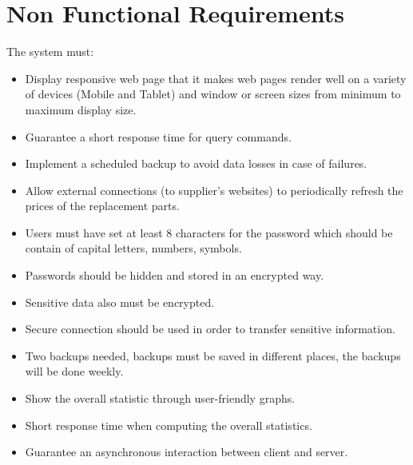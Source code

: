 \section{Non Functional Requirements}

The system must:

\begin{itemize}
	\item Display responsive web page that it makes web pages render well on a variety of devices (Mobile and Tablet) and window or screen sizes from minimum to maximum display size.
	\item Guarantee a short response time for query commands.
	\item Implement a scheduled backup to avoid data losses in case of failures.
	\item Allow external connections (to supplier's websites) to periodically refresh the prices of the replacement parts.
	\item Users must have set at least 8 characters for the password which should be contain of capital letters, numbers, symbols.
	\item Passwords should be hidden and stored in an encrypted way.
	\item Sensitive data also must be encrypted.
	\item Secure connection should be used in order to transfer sensitive information.
    \item Two backups needed, backups must be saved in different places, the backups will be done weekly.
    \item Show the overall statistic through user-friendly graphs.
    \item Short response time when computing the overall statistics.
    \item Guarantee an asynchronous interaction between client and server.
\end{itemize}
